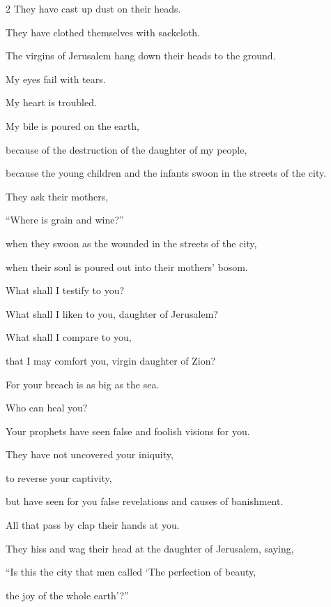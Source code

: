 \begin{multicols}{2}
	They have cast up dust on their heads.
	
	They have clothed themselves with sackcloth.
	
	The virgins of Jerusalem hang down their heads to the ground.
	\vspace{\baselineskip}
	
	\myverse{}My eyes fail with tears.
	
	My heart is troubled.
	
	My bile is poured on the earth,
	
	because of the destruction of the daughter of my people,
	
	because the young children and the infants swoon in the streets of the city.
	\vspace{\baselineskip}
	
	\myverse{}They ask their mothers,
	
	“Where is grain and wine?”
	
	when they swoon as the wounded in the streets of the city,
	
	when their soul is poured out into their mothers’ bosom.
	\vspace{\baselineskip}
	
	\myverse{}What shall I testify to you?
	
	What shall I liken to you, daughter of Jerusalem?
	
	What shall I compare to you,
	
	that I may comfort you, virgin daughter of Zion?
	
	For your breach is as big as the sea.
	
	Who can heal you?
	\vspace{\baselineskip}
	
	\myverse{}Your prophets have seen false and foolish visions for you.
	
	They have not uncovered your iniquity,
	
	to reverse your captivity,
	
	but have seen for you false revelations and causes of banishment.
	\vspace{\baselineskip}
	
	\myverse{}All that pass by clap their hands at you.
	
	They hiss and wag their head at the daughter of Jerusalem, saying,
	
	“Is this the city that men called ‘The perfection of beauty,
	
	the joy of the whole earth’?”
	\vspace{\baselineskip}
	

\end{multicols}
